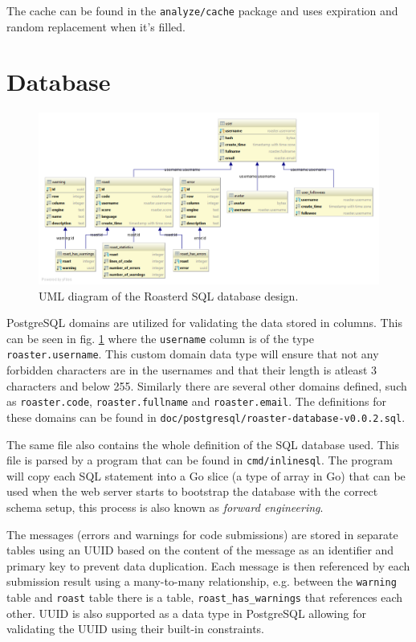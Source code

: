 \documentclass[12pt,a4paper]{report}
\begin{document}
The cache can be found in the \texttt{analyze/cache}\cite{roasterd-cache} package and uses expiration and random replacement when it's filled.

\section{Database}
\begin{figure}[H]
    \centering
    \includegraphics[width=16cm]{roaster-database-v0_0_1.png}
    \caption{UML diagram of the Roasterd SQL database design.}
    \label{fig:roasterd-database}
\end{figure}
PostgreSQL domains are utilized for validating the data stored in columns. This can be seen in fig. \ref{fig:roasterd-database} where the \texttt{username} column is of the type \texttt{roaster.username}. This custom domain data type will ensure that not any forbidden characters are in the usernames and that their length is atleast 3 characters and below 255. Similarly there are several other domains defined, such as \texttt{roaster.code}, \texttt{roaster.fullname} and \texttt{roaster.email}. The definitions for these domains can be found in \texttt{doc/postgresql/roaster-database-v0.0.2.sql}\cite{sql-def-line6}.

The same file also contains the whole definition of the SQL database used. This file is parsed by a program that can be found in \texttt{cmd/inlinesql}\cite{roasterd-cmd-inlinesql}. The program will copy each SQL statement into a Go slice (a type of array in Go) that can be used when the web server starts to bootstrap the database with the correct schema setup, this process is also known as \textit{forward engineering}.

\label{sec:database-messages}
The messages (errors and warnings for code submissions) are stored in separate tables using an UUID based on the content of the message as an identifier and primary key to prevent data duplication. Each message is then referenced by each submission result using a many-to-many relationship, e.g. between the \texttt{warning} table and \texttt{roast} table there is a table, \texttt{roast\_has\_warnings} that references each other. UUID is also supported as a data type in PostgreSQL\cite{pg-uuid} allowing for validating the UUID using their built-in constraints.
\end{document}
